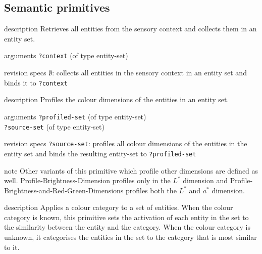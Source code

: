 \subsection{Semantic primitives}


\begin{explanation}{description}
Retrieves all entities from the sensory context and collects them in an entity set.
\end{explanation}

\begin{explanation}{arguments}
\verb+?context+ (of type entity-set)
\end{explanation}

\begin{explanation}{revision specs}
$\emptyset$: collects all entities in the sensory context in an entity set and binds it to \verb+?context+
\end{explanation}


\begin{explanation}{description}
Profiles the colour dimensions of the entities in an entity set.
\end{explanation}

\begin{explanation}{arguments}
\verb+?profiled-set+ (of type entity-set) \\
\verb+?source-set+ (of type entity-set)
\end{explanation}

\begin{explanation}{revision specs}
  \verb+?source-set+: profiles all colour dimensions of the entities
  in the entity set and binds the resulting entity-set to
  \verb+?profiled-set+
\end{explanation}

\begin{explanation}{note}
  Other variants of this primitive which profile other dimensions are
  defined as well. {\sc Profile-Brightness-Dimension} profiles only in
  the $L^*$ dimension and {\sc
    Profile-Brightness-and-Red-Green-Dimensions} profiles both the
  $L^*$ and $a^*$ dimension.
\end{explanation}


\begin{explanation}{description}
  Applies a colour category to a set of entities. When the colour
  category is known, this primitive sets the activation of each entity
  in the set to the similarity between the entity and the
  category. When the colour category is unknown, it categorises the
  entities in the set to the category that is most similar to it.
\end{explanation}

